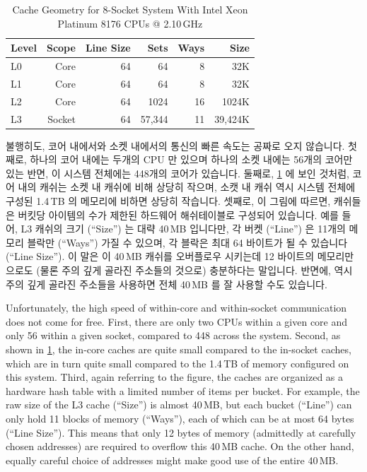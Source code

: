 \begin{table}
\renewcommand*{\arraystretch}{1.1}
\centering\small
\begin{tabular}{lrrrrr}
	\toprule
	Level &  Scope & Line Size &   Sets & Ways &    Size \\
	\midrule
	L0    &   Core &        64 &     64 &    8 &     32K \\
	L1    &   Core &        64 &     64 &    8 &     32K \\
	L2    &   Core &        64 &   1024 &   16 &   1024K \\
	L3    & Socket &        64 & 57,344 &   11 & 39,424K \\
	\bottomrule
\end{tabular}
\caption{Cache Geometry for 8-Socket System With Intel Xeon Platinum 8176 CPUs @ 2.10\,GHz}
\label{tab:cpu:Cache Geometry for 8-Socket System With Intel Xeon Platinum 8176 CPUs @ 2.10GHz}
\end{table}

불행히도, 코어 내에서와 소켓 내에서의 통신의 빠른 속도는 공짜로 오지 않습니다.
첫째로, 하나의 코어 내에는 두개의 CPU 만 있으며 하나의 소켓 내에는 56개의
코어만 있는 반면, 이 시스템 전체에는 448개의 코어가 있습니다.
둘째로,
\cref{tab:cpu:Cache Geometry for 8-Socket System With Intel Xeon Platinum 8176 CPUs @ 2.10GHz}
에 보인 것처럼, 코어 내의 캐쉬는 소켓 내 캐쉬에 비해 상당히 작으며, 소캣 내
캐쉬 역시 시스템 전체에 구성된 1.4\,TB 의 메모리에 비하면 상당히 작습니다.
셋째로, 이 그림에 따르면, 캐쉬들은 버킷당 아이템의 수가 제한된 하드웨어
해쉬테이블로 구성되어 있습니다.
예를 들어, L3 캐쉬의 크기 (``Size'') 는 대략 40\,MB 입니다만, 각 버켓
(``Line'') 은 11개의 메모리 블락만 (``Ways'') 가질 수 있으며, 각 블락은 최대 64
바이트가 될 수 있습니다 (``Line Size'').
이 말은 이 40\,MB 캐쉬를 오버플로우 시키는데 12 바이트의 메모리만으로도 (물론
주의 깊게 골라진 주소들의 것으로) 충분하다는 말입니다.
반면에, 역시 주의 깊게 골라진 주소들을 사용하면 전체 40\,MB 를 잘 사용할 수도
있습니다.

\iffalse

Unfortunately, the high speed of within-core and within-socket communication
does not come for free.
First, there are only two CPUs within a given core and only 56 within
a given socket, compared to 448 across the system.
Second, as shown in
\cref{tab:cpu:Cache Geometry for 8-Socket System With Intel Xeon Platinum 8176 CPUs @ 2.10GHz},
the in-core caches are quite small compared to the in-socket caches, which
are in turn quite small compared to the 1.4\,TB of memory configured on
this system.
Third, again referring to the figure, the caches are organized as
a hardware hash table with a limited number of items per bucket.
For example, the raw size of the L3 cache (``Size'') is almost 40\,MB, but each
bucket (``Line'') can only hold 11 blocks of memory (``Ways''), each
of which can be at most 64 bytes (``Line Size'').
This means that only 12 bytes of memory (admittedly at carefully chosen
addresses) are required to overflow this 40\,MB cache.
On the other hand, equally careful choice of addresses might make good
use of the entire 40\,MB.

